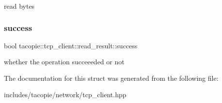 read bytes \mbox{\label{structtacopie_1_1tcp__client_1_1read__result_a9bb917b8d210159a95655a6f8da8e96e}} 
\subsubsection{\texorpdfstring{success}{success}}
{\footnotesize\ttfamily bool tacopie\+::tcp\+\_\+client\+::read\+\_\+result\+::success}

whether the operation succeeeded or not 

The documentation for this struct was generated from the following file\+:\begin{DoxyCompactItemize}
\item 
includes/tacopie/network/tcp\+\_\+client.\+hpp\end{DoxyCompactItemize}
